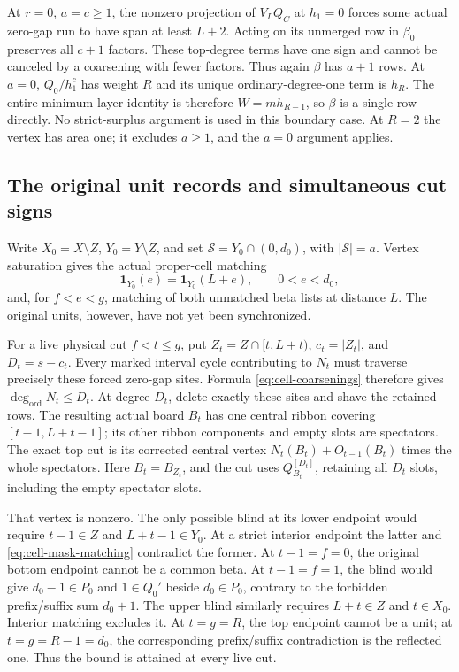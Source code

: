 \documentclass[11pt,a4paper]{amsart}
\numberwithin{equation}{section}
\theoremstyle{plain}
\theoremstyle{definition}
\newcommand{\one}{\mathbf1}
\begin{document}
At \(r=0\), \(a=c\ge1\), the nonzero projection of \(V_LQ_C\) at \(h_1=0\) forces
some actual zero-gap run to have span at least \(L+2\).  Acting on its
unmerged row in \(\beta_0\) preserves all \(c+1\) factors.  These top-degree
terms have one sign and cannot be canceled by a coarsening with fewer
factors.  Thus again \(\beta\) has \(a+1\) rows.
At \(a=0\), \(Q_0/h_1^c\) has weight \(R\) and its unique ordinary-degree-one
term is \(h_R\).  The entire minimum-layer identity is therefore
\(W=mh_{R-1}\), so \(\beta\) is a single row directly.  No strict-surplus
argument is used in this boundary case.  At \(R=2\) the vertex has area one;
it excludes \(a\ge1\), and the \(a=0\) argument applies.

\subsection{The original unit records and simultaneous cut signs}

Write \(X_0=X\setminus Z\), \(Y_0=Y\setminus Z\), and set
\(\mathcal S=Y_0\cap(0,d_0)\), with \(|\mathcal S|=a\).
Vertex saturation gives the actual proper-cell matching
\begin{equation}\label{eq:cell-mask-matching}
 \one_{Y_0}(e)=\one_{Y_0}(L+e),\qquad0<e<d_0,
\end{equation}
and, for \(f<e<g\), matching of both unmatched beta lists at distance \(L\).
The original units, however, have not yet been synchronized.

For a live physical cut \(f<t\le g\), put
\(Z_t=Z\cap[t,L+t)\), \(c_t=|Z_t|\), and \(D_t=s-c_t\).
Every marked interval cycle contributing to \(N_t\) must traverse precisely
these forced zero-gap sites.  Formula \eqref{eq:cell-coarsenings} therefore
gives \(\deg_{\mathrm{ord}}N_t\le D_t\).  At degree \(D_t\), delete exactly these
sites and shave the retained rows.  The resulting actual board \(B_t\) has
one central ribbon covering \([t-1,L+t-1]\); its other ribbon components and
empty slots are spectators.  The exact top cut is its corrected central
vertex \(N_t(B_t)+O_{t-1}(B_t)\) times the whole spectators.
Here \(B_t=B_{Z_t}\), and the cut uses \(Q_{B_t}^{[D_t]}\), retaining
all \(D_t\) slots, including the empty spectator slots.

That vertex is nonzero.  The only possible blind at its lower endpoint
would require \(t-1\in Z\) and \(L+t-1\in Y_0\).  At a strict interior
endpoint the latter and \eqref{eq:cell-mask-matching} contradict the
former.  At \(t-1=f=0\), the original bottom endpoint cannot be a common beta.
At \(t-1=f=1\), the blind would give \(d_0-1\in P_0\) and \(1\in Q_0'\)
beside \(d_0\in P_0\), contrary to the forbidden prefix/suffix sum \(d_0+1\).
The upper blind similarly requires \(L+t\in Z\) and \(t\in X_0\).
Interior matching excludes it.  At \(t=g=R\), the top endpoint cannot be a
unit; at \(t=g=R-1=d_0\), the corresponding prefix/suffix contradiction is
the reflected one.  Thus the bound is attained at every live cut.
\end{document}
